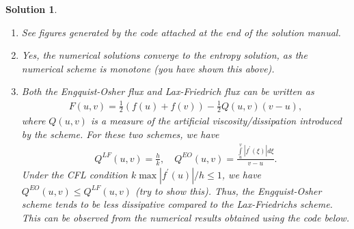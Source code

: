 \documentclass[10pt,letterpaper]{article}
\theoremstyle{break}
\newtheorem{solution}{Solution}
\begin{document}
\begin{solution}
	\begin{enumerate}
		\item
		See figures generated by the code
		attached at the end of the solution manual.
		
		\item
		Yes, the numerical solutions converge to the entropy solution, as the numerical scheme is monotone (you have shown this above).
		
		
		
		\item
		Both the Engquist-Osher flux and Lax-Friedrich flux can be written as
		\begin{gather}
		F(u,v) = \frac{1}{2} (f(u) + f(v)) - \frac{1}{2} Q(u,v) (v-u),
		\end{gather}
		where $Q(u,v)$ is a measure of the artificial viscosity/dissipation introduced by the scheme. For these two schemes, we have
		\begin{gather}
		Q^{LF}(u,v) = \frac{h}{k}, \quad Q^{EO}(u,v) = \frac{\int \limits_u^v |f^\prime(\xi) | d \xi }{v-u}.
		\end{gather}
		Under the CFL condition $k \max |f^\prime(u)| / h \leq 1$, we have $Q^{EO}(u,v) \leq Q^{LF}(u,v)$  (try to show this). Thus, the Engquist-Osher scheme tends to be less dissipative compared to the Lax-Friedrichs scheme. This can be observed from the numerical results obtained using the code below.
	\end{enumerate}
\end{solution}
\end{document}
